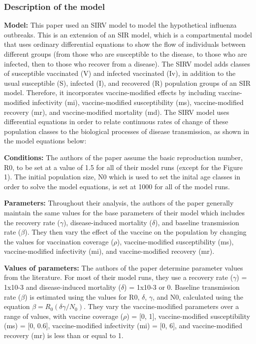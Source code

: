 \documentclass[]{article}
\begin{document}
\hypertarget{description-of-the-model}{%
\subsubsection{Description of the
model}\label{description-of-the-model}}

\textbf{Model:} This paper used an SIRV model to model the hypothetical
influenza outbreaks. This is an extension of an SIR model, which is a
compartmental model that uses ordinary differential equations to show
the flow of individuals between different groups (from those who are
susceptible to the disease, to those who are infected, then to those who
recover from a disease). The SIRV model adds classes of susceptible
vaccinated (V) and infected vaccinated (Iv), in addition to the usual
susceptible (S), infected (I), and recovered (R) population groups of an
SIR model. Therefore, it incorporates vaccine-modified effects by
including vaccine-modified infectivity (mi), vaccine-modified
susceptibility (ms), vaccine-modified recovery (mr), and
vaccine-modified mortality (md). The SIRV model uses differential
equations in order to relate continuous rates of change of these
population classes to the biological processes of disease transmission,
as shown in the model equations below:

\textbf{Conditions:} The authors of the paper assume the basic
reproduction number, R0, to be set at a value of 1.5 for all of their
model runs (except for the Figure 1). The initial population size, N0
which is used to set the inital age classes in order to solve the model
equations, is set at 1000 for all of the model runs.

\textbf{Parameters:} Throughout their analysis, the authors of the paper
generally maintain the same values for the base parameters of their
model which includes the recovery rate (\(\gamma\)), disease-induced
mortality (\(\delta\)), and baseline transmission rate (\(\beta\)). They
then vary the effect of the vaccine on the population by changing the
values for vaccination coverage (\(\rho\)), vaccine-modified
susceptibility (ms), vaccine-modified infectivity (mi), and
vaccine-modified recovery (mr).

\textbf{Values of parameters:} The authors of the paper determine
parameter values from the literature. For most of their model runs, they
use a recovery rate (\(\gamma\)) = 1x10-3 and disease-induced mortality
(\(\delta\)) = 1x10-3 or 0. Baseline transmission rate (\(\beta\)) is
estimated using the values for R0, \(\delta\), \(\gamma\), and N0,
calculated using the equation \(\beta= R_0(\delta\gamma/N_0)\). They
vary the vaccine-modified parameters over a range of values, with
vaccine coverage (\(\rho\)) = {[}0, 1{]}, vaccine-modified
susceptibility (ms) = {[}0, 0.6{]}, vaccine-modified infectivity (mi) =
{[}0, 6{]}, and vaccine-modified recovery (mr) is less than or equal to
1.
\end{document}
